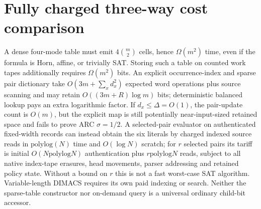 \documentclass[11pt]{article}
\begin{document}
\section*{Fully charged three-way cost comparison}
A dense four-mode table must emit $4\binom m2$ cells, hence $\Omega(m^2)$ time, even if the formula is Horn, affine, or trivially SAT. Storing such a table on counted work tapes additionally requires $\Omega(m^2)$ bits. An explicit occurrence-index and sparse pair dictionary take $O(3m+\sum_x d_x^2)$ expected word operations plus source scanning and may retain $O((3m+R)\log m)$ bits; deterministic balanced lookup pays an extra logarithmic factor. If $d_x\le\Delta=O(1)$, the pair-update count is $O(m)$, but the explicit map is still potentially near-input-sized retained space and fails to prove ARC $\sigma=1/2$. A selected-pair evaluator on authenticated fixed-width records can instead obtain the six literals by charged indexed source reads in $\mathrm{polylog}(N)$ time and $O(\log N)$ scratch; for $r$ selected pairs its tariff is initial $O(N\mathrm{polylog}N)$ authentication plus $r\mathrm{polylog}N$ reads, subject to all native index-tape erasures, head movements, parser addressing and retained policy state. Without a bound on $r$ this is not a fast worst-case SAT algorithm. Variable-length DIMACS requires its own paid indexing or search. Neither the sparse-table constructor nor on-demand query is a universal ordinary child-bit accessor.
\end{document}
